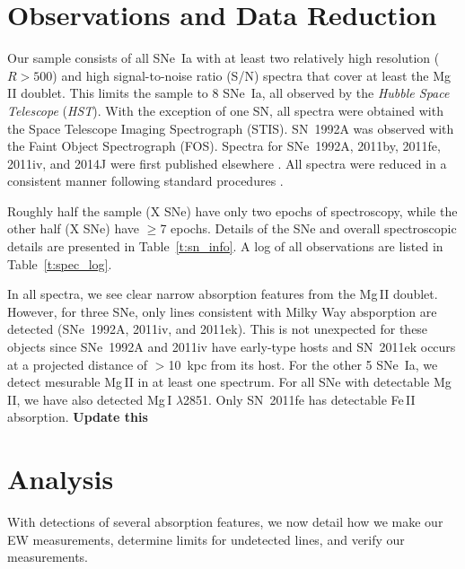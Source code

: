 \documentclass[useAMS,usenatbib]{mn2e}
\newcommand\ion[2]{#1$\,${\small{#2}}\relax}
\begin{document}

\section{Observations and Data Reduction}\label{s:obs}

Our sample consists of all SNe~Ia with at least two relatively high resolution ($R > 500$) and high signal-to-noise ratio (S/N) spectra that cover at least the \ion{Mg}{II} doublet.  This limits the sample to 8 SNe~Ia, all observed by the {\it Hubble Space Telescope} ({\it HST}).  With the exception of one SN, all spectra were obtained with the Space Telescope Imaging Spectrograph (STIS).  SN~1992A was observed with the Faint Object Spectrograph (FOS).  Spectra for SNe~1992A, 2011by, 2011fe, 2011iv, and 2014J were first published elsewhere \citep{Kirshner93, Foley12:11iv, Foley14:14j, Foley13:ca, Foley13:met, Mazzali13, Graham14}.  All spectra were reduced in a consistent manner following standard procedures \citep[e.g.,][]{Foley12:11iv}.

Roughly half the sample (X SNe) have only two epochs of spectroscopy, while the other half (X SNe) have $\ge$7 epochs.  Details of the SNe and overall spectroscopic details are presented in Table~\ref{t:sn_info}.  A log of all observations are listed in Table~\ref{t:spec_log}.

In all spectra, we see clear narrow absorption features from the \ion{Mg}{II} doublet.  However, for three SNe, only lines consistent with Milky Way absporption are detected (SNe~1992A, 2011iv, and 2011ek).  This is not unexpected for these objects since SNe~1992A and 2011iv have early-type hosts and SN~2011ek occurs at a projected distance of $>$10~kpc from its host.  For the other 5 SNe~Ia, we detect mesurable \ion{Mg}{II} in at least one spectrum.  For all SNe with detectable \ion{Mg}{II}, we have also detected \ion{Mg}{I} $\lambda$2851.  Only SN~2011fe has detectable \ion{Fe}{II} absorption. {\bf Update this}


\section{Analysis}\label{s:anal}

With detections of several absorption features, we now detail how we make our EW measurements, determine limits for undetected lines, and verify our measurements.
\end{document}

